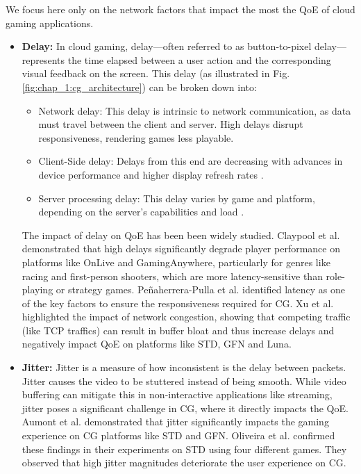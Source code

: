 We focus here only on the network factors that impact the most the \ac{QoE} of cloud gaming applications.
\begin{itemize}
    \item \textbf{Delay:} In cloud gaming, delay—often referred to as button-to-pixel delay—represents the time elapsed between a user action and the corresponding visual feedback on the screen. This delay (as illustrated in Fig. \ref{fig:chap_1:cg_architecture}) can be broken down into:
    \begin{itemize}
        \item Network delay: This delay is intrinsic to network communication, as data must travel between the client and server. High delays disrupt responsiveness, rendering games less playable.
        \item Client-Side delay: Delays from this end are decreasing with advances in device performance and higher display refresh rates \cite{Kmrinen2017AMS}.
        \item Server processing delay: This delay varies by game and platform, depending on the server's capabilities and load \cite{Iqbal2021DissectingCG}.
    \end{itemize}

    The impact of delay on QoE has been been widely studied. Claypool et al. \cite{Claypool2014TheEO} demonstrated that high delays significantly degrade player performance on platforms like OnLive and GamingAnywhere, particularly for genres like racing and first-person shooters, which are more latency-sensitive than role-playing or strategy games. Peñaherrera-Pulla et al. \cite{PeaherreraPulla2021MeasuringKQ} identified latency as one of the key factors to ensure the responsiveness required for CG. Xu et al. \cite{Xu2022MeasurementOT} highlighted the impact of network congestion, showing that competing traffic (like \ac{TCP} traffics) can result in buffer bloat and thus increase delays and negatively impact QoE on platforms like \ac{STD}, \ac{GFN} and Luna.

     \item \textbf{Jitter:} Jitter is a measure of how inconsistent is the delay between packets. Jitter causes the video to be stuttered instead of being smooth. While video buffering can mitigate this in non-interactive applications like streaming, jitter poses a significant challenge in CG, where it directly impacts the \ac{QoE}.  Aumont et al. \cite{Aumont2021DissectingCG} demonstrated that jitter significantly impacts the gaming experience on CG platforms like \ac{STD} and \ac{GFN}. Oliveira et al. \cite{FlanaganEffectsOJ} confirmed these findings in their experiments on STD using four different games. They observed that high jitter magnitudes deteriorate the user experience on CG.


\end{itemize}
